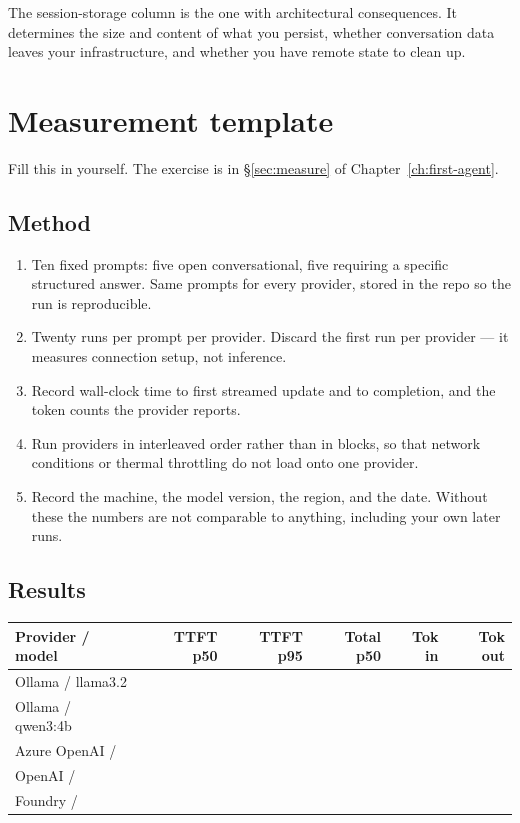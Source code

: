 The session-storage column is the one with architectural consequences. It
determines the size and content of what you persist, whether conversation data
leaves your infrastructure, and whether you have remote state to clean up.

\section{Measurement template}
\label{sec:measure-template}

Fill this in yourself. The exercise is in \S\ref{sec:measure} of
Chapter~\ref{ch:first-agent}.

\subsection{Method}

\begin{enumerate}[leftmargin=1.4em]
\item Ten fixed prompts: five open conversational, five requiring a specific
      structured answer. Same prompts for every provider, stored in the repo so
      the run is reproducible.
\item Twenty runs per prompt per provider. Discard the first run per provider ---
      it measures connection setup, not inference.
\item Record wall-clock time to first streamed update and to completion, and the
      token counts the provider reports.
\item Run providers in interleaved order rather than in blocks, so that network
      conditions or thermal throttling do not load onto one provider.
\item Record the machine, the model version, the region, and the date. Without
      these the numbers are not comparable to anything, including your own later
      runs.
\end{enumerate}

\subsection{Results}

\begin{center}
\small
\begin{tabularx}{\linewidth}{@{}Xrrrrr@{}}
\toprule
\textbf{Provider / model} & \textbf{TTFT p50} & \textbf{TTFT p95} & \textbf{Total p50} & \textbf{Tok in} & \textbf{Tok out} \\
\midrule
Ollama / llama3.2 & & & & & \\
Ollama / qwen3:4b & & & & & \\
Azure OpenAI / & & & & & \\
OpenAI / & & & & & \\
Foundry / & & & & & \\
\bottomrule
\end{tabularx}
\end{center}

